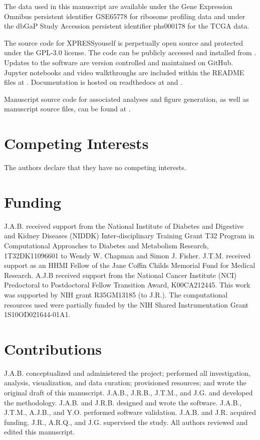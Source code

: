 \documentclass[10pt, oneside]{article}
\begin{document}
The data used in this manuscript are available under the Gene Expression Omnibus persistent identifier GSE65778 \cite{isrib_geo} for ribosome profiling data and under the dbGaP Study Accession persistent identifier phs000178 \cite{tcga_data} for the TCGA data. \par

The source code for XPRESSyouself is perpetually open source and protected under the GPL-3.0 license. The code can be publicly accessed and installed from \cite{xpressyourself}. Updates to the software are version controlled and maintained on GitHub. Jupyter notebooks and video walkthroughs are included within the README files at \cite{xpressyourself}. Documentation is hosted on readthedocs \cite{readthedocs} at \cite{xpresspipe_docs} and \cite{xpressplot_docs}. \par

Manuscript source code for associated analyses and figure generation, as well as manuscript source files, can be found at \cite{manuscript}.

\section*{Competing Interests}
The authors declare that they have no competing interests.

\section*{Funding}
J.A.B. received support from the National Institute of Diabetes and Digestive and Kidney Diseases (NIDDK) Inter-disciplinary Training Grant T32 Program in Computational Approaches to Diabetes and Metabolism Research, 1T32DK11096601 to Wendy W. Chapman and Simon J. Fisher. J.T.M. received support as an HHMI Fellow of the Jane Coffin Childs Memorial Fund for Medical Research. A.J.B received support from the National Cancer Institute (NCI) Predoctoral to Postdoctoral Fellow Transition Award, K00CA212445. This work was supported by NIH grant R35GM13185 (to J.R.). The computational resources used were partially funded by the NIH Shared Instrumentation Grant 1S10OD021644-01A1.

\section*{Contributions}
J.A.B. conceptualized and administered the project; performed all investigation, analysis, visualization, and data curation; provisioned resources; and wrote the original draft of this manuscript. J.A.B., J.R.B., J.T.M., and J.G. and developed the methodology. J.A.B. and J.R.B. designed and wrote the software. J.A.B., J.T.M., A.J.B., and Y.O. performed software validation. J.A.B. and J.R. acquired funding. J.R., A.R.Q., and J.G. supervised the study. All authors reviewed and edited this manuscript.
\end{document}
